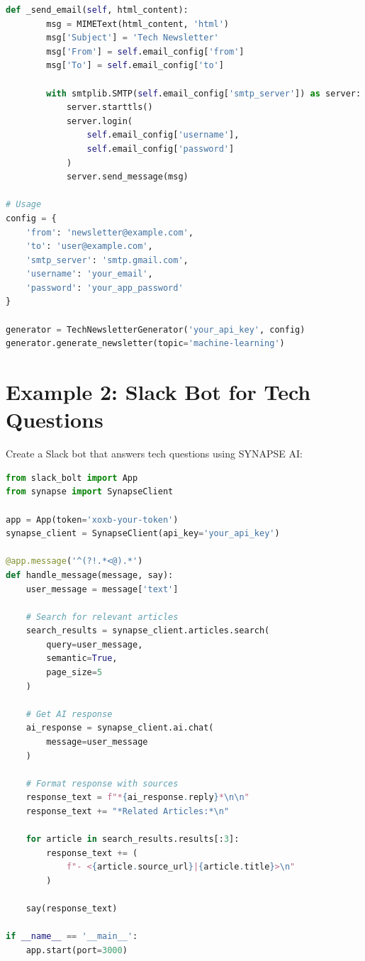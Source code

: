 \documentclass{report}
\begin{document}
\begin{lstlisting}[language=Python]
    def _send_email(self, html_content):
        msg = MIMEText(html_content, 'html')
        msg['Subject'] = 'Tech Newsletter'
        msg['From'] = self.email_config['from']
        msg['To'] = self.email_config['to']
        
        with smtplib.SMTP(self.email_config['smtp_server']) as server:
            server.starttls()
            server.login(
                self.email_config['username'],
                self.email_config['password']
            )
            server.send_message(msg)

# Usage
config = {
    'from': 'newsletter@example.com',
    'to': 'user@example.com',
    'smtp_server': 'smtp.gmail.com',
    'username': 'your_email',
    'password': 'your_app_password'
}

generator = TechNewsletterGenerator('your_api_key', config)
generator.generate_newsletter(topic='machine-learning')
\end{lstlisting}

\section{Example 2: Slack Bot for Tech Questions}

Create a Slack bot that answers tech questions using SYNAPSE AI:

\begin{lstlisting}[language=Python]
from slack_bolt import App
from synapse import SynapseClient

app = App(token='xoxb-your-token')
synapse_client = SynapseClient(api_key='your_api_key')

@app.message('^(?!.*<@).*')
def handle_message(message, say):
    user_message = message['text']
    
    # Search for relevant articles
    search_results = synapse_client.articles.search(
        query=user_message,
        semantic=True,
        page_size=5
    )
    
    # Get AI response
    ai_response = synapse_client.ai.chat(
        message=user_message
    )
    
    # Format response with sources
    response_text = f"*{ai_response.reply}*\n\n"
    response_text += "*Related Articles:*\n"
    
    for article in search_results.results[:3]:
        response_text += (
            f"- <{article.source_url}|{article.title}>\n"
        )
    
    say(response_text)

if __name__ == '__main__':
    app.start(port=3000)
\end{lstlisting}
\end{document}
